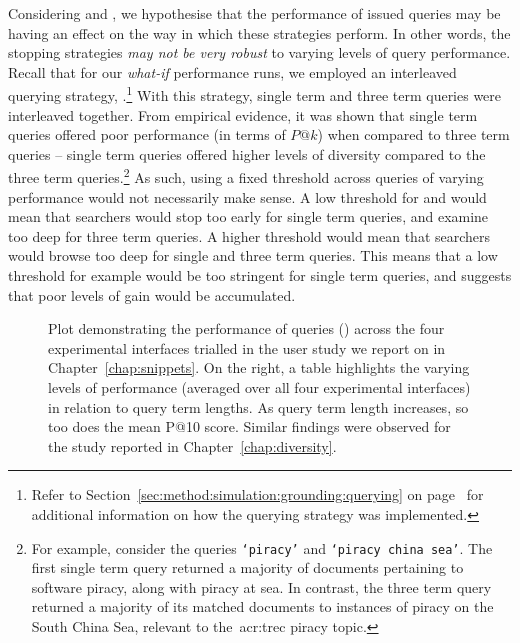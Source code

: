 Considering  and , we hypothesise that the performance of issued queries may be having an effect on the way in which these strategies perform. In other words, the stopping strategies \emph{may not be very robust} to varying levels of query performance. Recall that for our \emph{what-if} performance runs, we employed an interleaved querying strategy, .\footnote{Refer to Section~\ref{sec:method:simulation:grounding:querying} on page~\pageref{sec:method:simulation:grounding:querying} for additional information on how the querying strategy was implemented.} With this strategy, single term and three term queries were interleaved together. From empirical evidence, it was shown that single term queries offered poor performance (in terms of $P@k$) when compared to three term queries -- single term queries offered higher levels of diversity compared to the three term queries.\footnote{For example, consider the queries \texttt{`piracy'} and \texttt{`piracy china sea'}. The first single term query returned a majority of documents pertaining to software piracy, along with piracy at sea. In contrast, the three term query returned a majority of its matched documents to instances of piracy on the South China Sea, relevant to the~\gls{acr:trec} piracy topic.} As such, using a fixed threshold across queries of varying performance would not necessarily make sense. A low threshold for  and  would mean that searchers would stop too early for single term queries, and examine too deep for three term queries. A higher threshold would mean that searchers would browse too deep for single and three term queries. This means that a low threshold for example would be too stringent for single term queries, and suggests that poor levels of gain would be accumulated.

\begin{figure}[t!]
    \centering
    \caption[Query performance by real-world subjects]{Plot demonstrating the performance of queries () across the four experimental interfaces trialled in the user study we report on in Chapter~\ref{chap:snippets}. On the right, a table highlights the varying levels of performance (averaged over all four experimental interfaces) in relation to query term lengths. As query term length increases, so too does the mean P@10 score. Similar findings were observed for the study reported in Chapter~\ref{chap:diversity}.}
    \label{fig:query_performance_ch7}
\end{figure}


